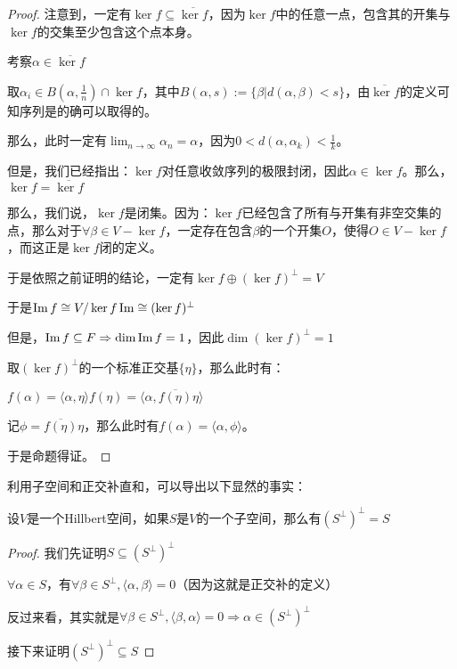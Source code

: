 \documentclass[12pt, a4paper, oneside, UTF8]{ctexbook}
\begin{document}
\begin{para}{0}
\begin{proof}
						注意到，一定有$\ker f \subseteq \overline{\ker f}$，因为$\ker f$中的任意一点，包含其的开集与$\ker f$的交集至少包含这个点本身。

						考察$\alpha \in \overline{\ker f}$

						取$\alpha_i \in B(\alpha ,\frac{1}{n}) \cap \ker f$，其中$B(\alpha ,s):=\{\beta |d(\alpha ,\beta )< s\}$，由$\overline{\ker f}$的定义可知序列是的确可以取得的。

						那么，此时一定有$\lim_{n \to \infty} \alpha_n = \alpha $，因为$0 < d(\alpha ,\alpha_k)<\frac{1}{k}$。

						但是，我们已经指出：$\ker f$对任意收敛序列的极限封闭，因此$\alpha \in \ker f$。那么，$\ker f = \overline{\ker f}$

						那么，我们说，$\ker f$是闭集。因为：$\ker f$已经包含了所有与开集有非空交集的点，那么对于$\forall \beta \in V-\ker f$，一定存在包含$\beta $的一个开集$O$，使得$O\in V-\ker f$，而这正是$\ker f$闭的定义。

						于是依照之前证明的结论，一定有$\ker f \oplus (\ker f)^{\perp} = V$

						于是$\operatorname{Im} f \cong V/\ker f \operatorname{Im} \cong (\ker f)^{\perp}$

						但是，$\operatorname{Im} f \subseteq F \Rightarrow \dim \operatorname{Im} f = 1$，因此$\dim (\ker f)^{\perp} = 1$

						取$(\ker f)^{\perp}$的一个标准正交基$\{\eta \}$，那么此时有：

						$f(\alpha )=\langle \alpha ,\eta \rangle f(\eta) =\langle \alpha ,\overline{f(\eta )}\eta \rangle$

						记$\phi = \overline{f(\eta )}\eta$，那么此时有$f(\alpha )=\langle \alpha ,\phi \rangle$。

						于是命题得证。
					\end{proof}
					利用子空间和正交补直和，可以导出以下显然的事实：
					\begin{proposition}
						设$V$是一个Hillbert空间，如果$S$是$V$的一个子空间，那么有$(S^{\perp})^{\perp} =S$
					\end{proposition}
					\begin{proof}
						我们先证明$S \subseteq (S^{\perp})^{\perp}$

						$\forall \alpha \in S$，有$\forall \beta \in S^{\perp} ,\langle \alpha ,\beta \rangle = 0$（因为这就是正交补的定义）

						反过来看，其实就是$\forall \beta \in S^{\perp} ,\langle \beta ,\alpha \rangle = 0 \Rightarrow \alpha \in (S^{\perp})^{\perp}$

						接下来证明$(S^{\perp})^{\perp} \subseteq S$


\end{proof}
\end{para}
\end{document}
